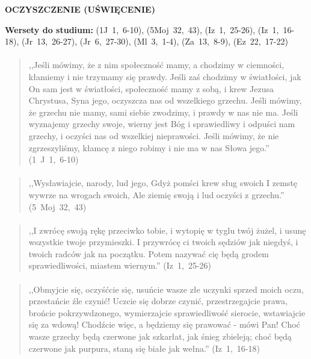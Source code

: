 \documentclass[10pt,a4paper,oneside]{article}
\begin{document}
\centerline{\textbf{\MakeUppercase{Oczyszczenie (uświęcenie)}}}
\begin{center}
\textbf{Wersety do studium:} 
\mbox{(1J 1, 6-10)}, \mbox{(5Moj 32, 43)}, \mbox{(Iz 1, 25-26)}, \mbox{(Iz 1, 16-18)}, \mbox{(Jr 13, 26-27)}, \mbox{(Jr 6, 27-30)}, \mbox{(Ml 3, 1-4)}, \mbox{(Za 13, 8-9)}, \mbox{(Ez 22, 17-22)}
\end{center}
\paragraph{}
\begin{quote}
,,Jeśli mówimy, że z nim społeczność mamy, a chodzimy w ciemności, kłamiemy i nie trzymamy się prawdy. Jeśli zaś chodzimy w światłości, jak On sam jest w światłości, społeczność mamy z sobą, i krew Jezusa Chrystusa, Syna jego, oczyszcza nas od wszelkiego grzechu. Jeśli mówimy, że grzechu nie mamy, sami siebie zwodzimy, i prawdy w nas nie ma. Jeśli wyznajemy grzechy swoje, wierny jest Bóg i sprawiedliwy i odpuści nam grzechy, i oczyści nas od wszelkiej nieprawości. Jeśli mówimy, że nie zgrzeszyliśmy, kłamcę z niego robimy i nie ma w nas Słowa jego.'' \mbox{(1 J 1, 6-10)}
\end{quote}
\paragraph{}
\begin{quote}
,,Wysławiajcie, narody, lud jego, Gdyż pomści krew sług swoich I zemstę wywrze na wrogach swoich, Ale ziemię swoją i lud oczyści z grzechu.'' \mbox{(5 Moj 32, 43)}
\end{quote}
\paragraph{}
\begin{quote}
,,I zwrócę swoją rękę przeciwko tobie, i wytopię w tyglu twój żużel, i usunę wszystkie twoje przymieszki. I przywrócę ci twoich sędziów jak niegdyś, i twoich radców jak na początku. Potem nazywać cię będą grodem sprawiedliwości, miastem wiernym.'' \mbox{(Iz 1, 25-26)}
\end{quote}
\paragraph{}
\begin{quote}
,,Obmyjcie się, oczyśćcie się, usuńcie wasze złe uczynki sprzed moich oczu, przestańcie źle czynić! Uczcie się dobrze czynić, przestrzegajcie prawa, brońcie pokrzywdzonego, wymierzajcie sprawiedliwość sierocie, wstawiajcie się za wdową! Chodźcie więc, a będziemy się prawować - mówi Pan! Choć wasze grzechy będą czerwone jak szkarłat, jak śnieg zbieleją; choć będą czerwone jak purpura, staną się białe jak wełna.'' \mbox{(Iz 1, 16-18)}
\end{quote}
\end{document}

